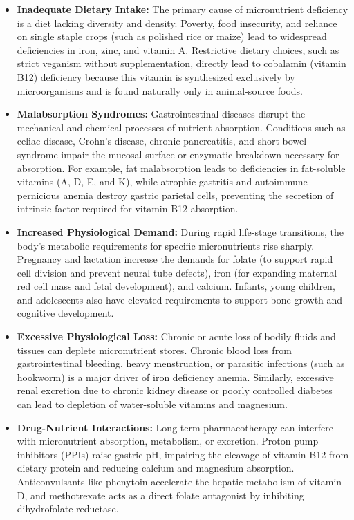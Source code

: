 \begin{itemize}
    \item \textbf{Inadequate Dietary Intake:} The primary cause of micronutrient deficiency is a diet lacking diversity and density. Poverty, food insecurity, and reliance on single staple crops (such as polished rice or maize) lead to widespread deficiencies in iron, zinc, and vitamin A. Restrictive dietary choices, such as strict veganism without supplementation, directly lead to cobalamin (vitamin B12) deficiency because this vitamin is synthesized exclusively by microorganisms and is found naturally only in animal-source foods.
    \item \textbf{Malabsorption Syndromes:} Gastrointestinal diseases disrupt the mechanical and chemical processes of nutrient absorption. Conditions such as celiac disease, Crohn's disease, chronic pancreatitis, and short bowel syndrome impair the mucosal surface or enzymatic breakdown necessary for absorption. For example, fat malabsorption leads to deficiencies in fat-soluble vitamins (A, D, E, and K), while atrophic gastritis and autoimmune pernicious anemia destroy gastric parietal cells, preventing the secretion of intrinsic factor required for vitamin B12 absorption.
    \item \textbf{Increased Physiological Demand:} During rapid life-stage transitions, the body's metabolic requirements for specific micronutrients rise sharply. Pregnancy and lactation increase the demands for folate (to support rapid cell division and prevent neural tube defects), iron (for expanding maternal red cell mass and fetal development), and calcium. Infants, young children, and adolescents also have elevated requirements to support bone growth and cognitive development.
    \item \textbf{Excessive Physiological Loss:} Chronic or acute loss of bodily fluids and tissues can deplete micronutrient stores. Chronic blood loss from gastrointestinal bleeding, heavy menstruation, or parasitic infections (such as hookworm) is a major driver of iron deficiency anemia. Similarly, excessive renal excretion due to chronic kidney disease or poorly controlled diabetes can lead to depletion of water-soluble vitamins and magnesium.
    \item \textbf{Drug-Nutrient Interactions:} Long-term pharmacotherapy can interfere with micronutrient absorption, metabolism, or excretion. Proton pump inhibitors (PPIs) raise gastric pH, impairing the cleavage of vitamin B12 from dietary protein and reducing calcium and magnesium absorption. Anticonvulsants like phenytoin accelerate the hepatic metabolism of vitamin D, and methotrexate acts as a direct folate antagonist by inhibiting dihydrofolate reductase.

\end{itemize}
